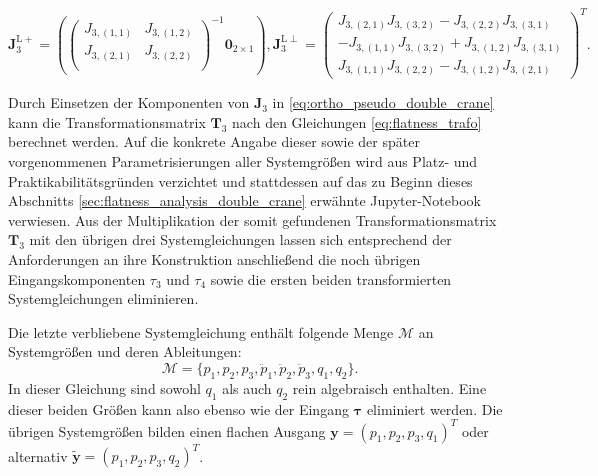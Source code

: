 \begin{equation}
	\label{eq:ortho_pseudo_double_crane}
	\mathbf{J}_3^{\mathrm{L}+} =
	\left(
	\left(\begin{matrix}
		J_{3, (1,1)} & J_{3, (1,2)}\\
		J_{3, (2,1)} & J_{3, (2,2)}\\
	\end{matrix}\right)^{-1}	
	\mathbf{0}_{2 \times 1}
	\right), 		
	\mathbf{J}_3^{\mathrm{L}\perp} =
	\left(\begin{matrix}
		J_{3, (2,1)} J_{3, (3,2)} - J_{3, (2,2)} J_{3, (3,1)} \\
		-J_{3, (1,1)} J_{3, (3,2)} + J_{3, (1,2)} J_{3, (3,1)} \\
		J_{3, (1,1)} J_{3, (2,2)} - J_{3, (1,2)} J_{3, (2,1)}
	\end{matrix}\right)^T.
\end{equation}

Durch Einsetzen der Komponenten von $\mathbf{J}_3$ in \eqref{eq:ortho_pseudo_double_crane} kann die Transformationsmatrix $\mathbf{T}_3$ nach den Gleichungen \eqref{eq:flatness_trafo} berechnet werden. Auf die konkrete Angabe dieser sowie der später vorgenommenen Parametrisierungen aller Systemgrößen wird aus Platz- und Praktikabilitätsgründen verzichtet und stattdessen auf das zu Beginn dieses Abschnitts \ref{sec:flatness_analysis_double_crane} erwähnte Jupyter-Notebook verwiesen. Aus der Multiplikation der somit gefundenen Transformationsmatrix $\mathbf{T}_3$ mit den übrigen drei Systemgleichungen lassen sich entsprechend der Anforderungen an ihre Konstruktion anschließend die noch übrigen Eingangskomponenten $\tau_{3}$ und $\tau_{4}$ sowie die ersten beiden transformierten Systemgleichungen eliminieren.

Die letzte verbliebene Systemgleichung enthält folgende Menge $\mathcal{M}$ an Systemgrößen und deren Ableitungen:
\begin{equation}
	\mathcal{M} = \{p_1, p_2, p_3, \ddot{p}_1, \ddot{p}_2, \ddot{p}_3, q_1, q_2 \}.
\end{equation}
In dieser Gleichung sind sowohl $q_1$ als auch $q_2$ rein algebraisch enthalten. Eine dieser beiden Größen kann also ebenso wie der Eingang $\boldsymbol{\tau}$ eliminiert werden. Die übrigen Systemgrößen bilden einen flachen Ausgang $\mathbf{y} = (p_1, p_2, p_3, q_1)^T$ oder alternativ ${\tilde{\mathbf{y}} = (p_1, p_2, p_3, q_2)^T}$.

